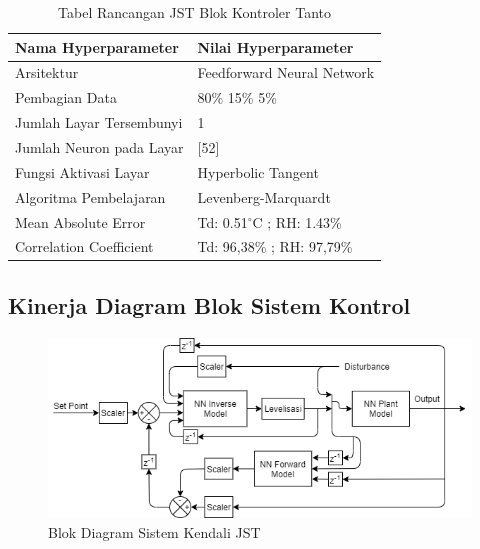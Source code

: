 \begin{table}[!hbt]
	\caption{Tabel Rancangan JST Blok Kontroler Tanto}
	\label{tbl:5:NNInternalModel}
	\centering
	\begin{tabular}{|p{5.7cm}|p{5cm}|}
		\hline
		\textbf{Nama Hyperparameter} & \textbf{Nilai Hyperparameter} \\ \hline
		Arsitektur & Feedforward Neural Network \\ \hline
		Pembagian Data & 80\% 15\% 5\% \\ \hline 
		Jumlah Layar Tersembunyi & 1 \\ \hline
		Jumlah Neuron pada Layar & [52] \\ \hline
		Fungsi Aktivasi Layar & Hyperbolic Tangent \\ \hline
		Algoritma Pembelajaran & Levenberg-Marquardt \\ \hline
		Mean Absolute Error & Td: 0.51$^\circ$C ; RH: 1.43\% \\ \hline
		Correlation Coefficient & Td: 96,38\% ; RH: 97,79\% \\ \hline
	\end{tabular}
\end{table}

\subsection{Kinerja Diagram Blok Sistem Kontrol}

\begin{figure}[!h]
	\centering
	\includegraphics[width=1\textwidth]{figures/ControlDesignDiagram}
	\caption{Blok Diagram Sistem Kendali JST}
	\label{fig:5:ConstrolSystemBlockDiagram}
\end{figure}
